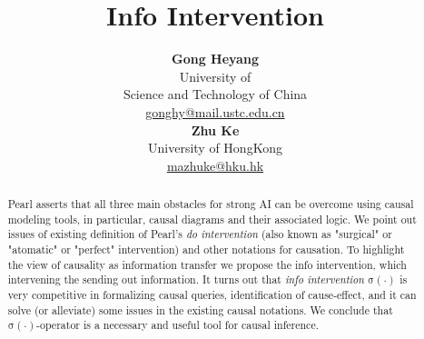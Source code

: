 \documentclass[letterpaper, onecolumn]{article}
\title{Info Intervention}
\author{ {\bf Gong Heyang}\\
	University of \\ Science and Technology of China\\
	\url{gonghy@mail.ustc.edu.cn}\\
	\And
	{\bf Zhu Ke}\\
	University of HongKong \\
	\url{mazhuke@hku.hk}\\
}
\newcommand{\info}{\mathrm{\sigma}}
\begin{document}
	\begin{CJK*}{UTF8}{gbsn}
		\maketitle
		\begin{abstract}
		    Pearl asserts that all three main obstacles for strong AI can be overcome using causal modeling tools, in particular, causal diagrams and their associated logic.  We point out issues of existing definition of  Pearl's \textit{do intervention} (also known as "surgical" or "atomatic" or "perfect"  intervention) and other notations for causation. To highlight the view of causality as information transfer we propose the info intervention, which intervening the sending out information. It turns out that \emph{info intervention} $\info(\cdot)$ is very competitive in formalizing causal queries, identification of cause-effect, and it can solve (or alleviate) some issues in the existing causal notations. We conclude that $\info(\cdot)$-operator is a necessary and useful tool for causal inference.
		\end{abstract}
		
		
		
		
		
		
		
		
		\small
		
		
		\newpage
		\appendix
		\normalsize
		
		
	\end{CJK*}
\end{document}
